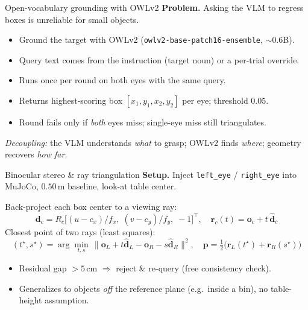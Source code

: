 \documentclass[aspectratio=169,10pt]{beamer}
\begin{document}
\begin{frame}{Open-vocabulary grounding with OWLv2}
\textbf{Problem.} Asking the VLM to regress boxes is unreliable for small objects.
\begin{itemize}
    \item Ground the target with \alert{OWLv2} (\texttt{owlv2-base-patch16-ensemble}, $\sim$0.6B).
    \item Query text comes from the instruction (target noun) or a per-trial override.
    \item Runs \alert{once per round on both eyes} with the same query.
    \item Returns highest-scoring box $[x_1,y_1,x_2,y_2]$ per eye; threshold $0.05$.
    \item Round fails only if \emph{both} eyes miss; single-eye miss still triangulates.
\end{itemize}
\vspace{3pt}
\footnotesize\textit{Decoupling:} the VLM understands \emph{what} to grasp; OWLv2 finds \emph{where}; geometry recovers \emph{how far}.
\end{frame}

\begin{frame}{Binocular stereo \& ray triangulation}
\textbf{Setup.} Inject \texttt{left\_eye} / \texttt{right\_eye} into MuJoCo, $0.50$\,m baseline, look-at table center.

Back-project each box center to a viewing ray:
\[
\mathbf{d}_c = R_c\big[(u{-}c_x)/f_x,\;(v{-}c_y)/f_y,\;-1\big]^{\!\top},\quad
\mathbf{r}_c(t)=\mathbf{o}_c+t\,\hat{\mathbf{d}}_c
\]
Closest point of two rays (least squares):
\[
(t^\star,s^\star)=\arg\min_{t,s}\,\big\|\mathbf{o}_L+t\hat{\mathbf{d}}_L-\mathbf{o}_R-s\hat{\mathbf{d}}_R\big\|^2,\quad
\mathbf{p}=\tfrac{1}{2}\big(\mathbf{r}_L(t^\star)+\mathbf{r}_R(s^\star)\big)
\]
\vspace{-4pt}
\begin{itemize}
    \item Residual gap $>5$\,cm $\Rightarrow$ reject \& re-query (free consistency check).
    \item Generalizes to objects \emph{off} the reference plane (e.g.\ inside a bin), no table-height assumption.
\end{itemize}
\end{frame}
\end{document}
